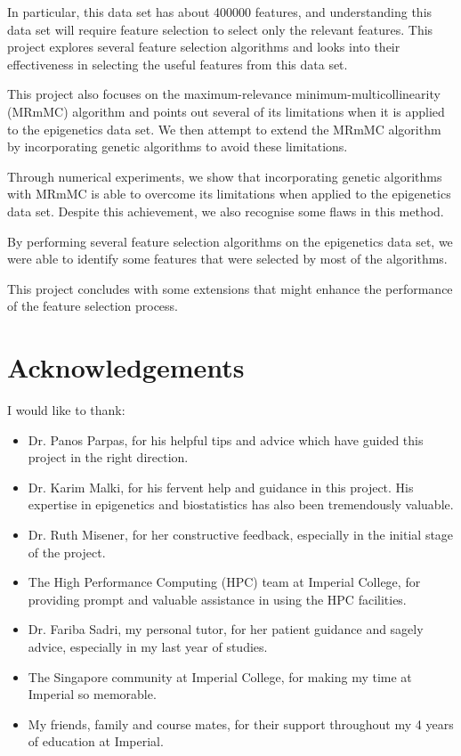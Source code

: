 \documentclass[12pt, twoside, a4paper]{report}
\newcommand\blankpage{%
    \null
    \thispagestyle{empty}%
    \addtocounter{page}{-1}%
    \newpage}
\begin{document}
In particular, this data set has about 400000 features, and understanding this data set will require feature selection to select only the relevant features. This project explores several feature selection algorithms and looks into their effectiveness in selecting the useful features from this data set.

This project also focuses on the maximum-relevance minimum-multicollinearity (MRmMC) algorithm and points out several of its limitations when it is applied to the epigenetics data set. We then attempt to extend the MRmMC algorithm by incorporating genetic algorithms to avoid these limitations.

Through numerical experiments, we show that incorporating genetic algorithms with MRmMC is able to overcome its limitations when applied to the epigenetics data set. Despite this achievement, we also recognise some flaws in this method.

By performing several feature selection algorithms on the epigenetics data set, we were able to identify some features that were selected by most of the algorithms.

This project concludes with some extensions that might enhance the performance of the feature selection process.

\afterpage{\blankpage}

\chapter*{Acknowledgements}


I would like to thank:
\begin{itemize}
  \item Dr. Panos Parpas, for his helpful tips and advice which have guided this project in the right direction.
  \item Dr. Karim Malki, for his fervent help and guidance in this project. His expertise in epigenetics and biostatistics has also been tremendously valuable.
  \item Dr. Ruth Misener, for her constructive feedback, especially in the initial stage of the project.
  \item The High Performance Computing (HPC) team at Imperial College, for providing prompt and valuable assistance in using the HPC facilities.
  \item Dr. Fariba Sadri, my personal tutor, for her patient guidance and sagely advice, especially in my last year of studies.
  \item The Singapore community at Imperial College, for making my time at Imperial so memorable.
  \item My friends, family and course mates, for their support throughout my 4 years of education at Imperial.
\end{itemize}
\end{document}
